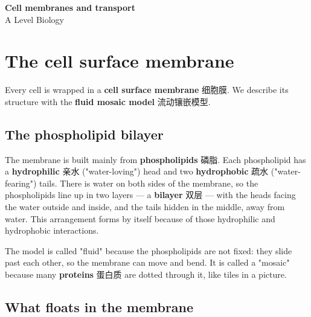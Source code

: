 \documentclass[11pt]{article}
\begin{document}
\begin{center}
  {\LARGE\bfseries Cell membranes and transport}\\[0.35em]
  {\large A Level Biology}
\end{center}
\vspace{0.6em}

\section*{The cell surface membrane}

Every cell is wrapped in a \textbf{cell surface membrane} 细胞膜. We describe its structure with the \textbf{fluid mosaic model} 流动镶嵌模型.

\subsection*{The phospholipid bilayer}

The membrane is built mainly from \textbf{phospholipids} 磷脂. Each phospholipid has a \textbf{hydrophilic} 亲水 ("water-loving") head and two \textbf{hydrophobic} 疏水 ("water-fearing") tails. There is water on both sides of the membrane, so the phospholipids line up in two layers — a \textbf{bilayer} 双层 — with the heads facing the water outside and inside, and the tails hidden in the middle, away from water. This arrangement forms by itself because of those hydrophilic and hydrophobic interactions.

The model is called "fluid" because the phospholipids are not fixed: they slide past each other, so the membrane can move and bend. It is called a "mosaic" because many \textbf{proteins} 蛋白质 are dotted through it, like tiles in a picture.

\subsection*{What floats in the membrane}

\begin{center}
\end{center}
\end{document}
